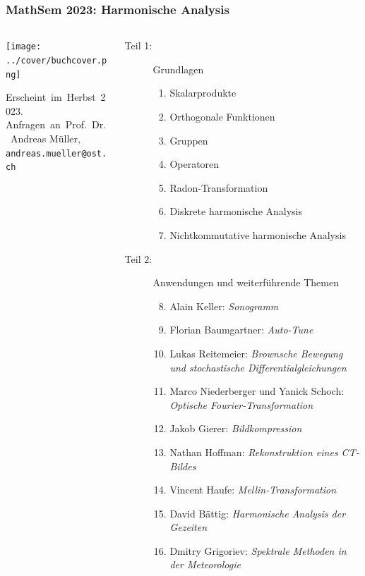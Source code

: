 \documentclass[handout]{beamer}
\title[]{}
\begin{document}
\begin{frame}
\frametitle{%
MathSem 2023: Harmonische Analysis}
\begin{columns}[t,onlytextwidth]
\begin{column}{0.32\textwidth}
\begin{center}
\texttt{[image: ../cover/buchcover.png]}
\end{center}
\vskip 0.2cm
\bigskip
\bigskip
Erscheint~im~Herbst~2023.\\
Anfragen~an~Prof.~Dr.~Andreas Müller,\\
{\texttt{andreas.mueller@ost.ch}}
\bigskip
\bigskip
\bigskip
\end{column}
%
\begin{column}{0.65\textwidth}
\begin{description}
\item[Teil 1:] Grundlagen
\begin{enumerate}
\item Skalarprodukte
\item Orthogonale Funktionen
\item Gruppen
\item Operatoren
\item Radon-Transformation
\item Diskrete harmonische Analysis
\item Nichtkommutative harmonische Analysis
\end{enumerate}
\item[Teil 2:] Anwendungen und weiterführende Themen
\begin{enumerate}
\setcounter{enumi}{7}
\item Alain Keller: {\em Sonogramm}
\item Florian Baumgartner: {\em Auto-Tune}
\item Lukas Reitemeier:
{\em Brownsche Bewegung und stochastische Differentialgleichungen}
\item Marco Niederberger und Yanick Schoch:
{\em Optische Fourier-Transformation}
\item Jakob Gierer: {\em Bildkompression}
\item Nathan Hoffman: {\em Rekonstruktion eines CT-Bildes}
\item Vincent Haufe: {\em Mellin-Transformation}
\item David Bättig: {\em Harmonische Analysis der Gezeiten}
\item Dmitry Grigoriev: {\em Spektrale Methoden in der Meteorologie}

\end{enumerate}
\end{description}
\end{column}
\end{columns}
\end{frame}
\end{document}
